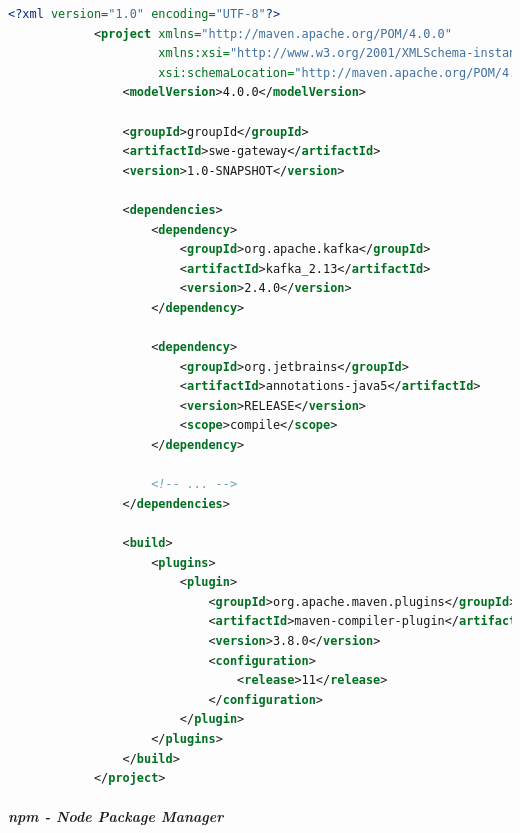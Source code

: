 		\begin{lstlisting}[language=xml,captionpos=b,caption={Esempio di implementazione di un file pom.xml}]
			<?xml version="1.0" encoding="UTF-8"?>
			<project xmlns="http://maven.apache.org/POM/4.0.0"
			         xmlns:xsi="http://www.w3.org/2001/XMLSchema-instance"
			         xsi:schemaLocation="http://maven.apache.org/POM/4.0.0 http://maven.apache.org/xsd/maven-4.0.0.xsd">
			    <modelVersion>4.0.0</modelVersion>
			
			    <groupId>groupId</groupId>
			    <artifactId>swe-gateway</artifactId>
			    <version>1.0-SNAPSHOT</version>
			    
			    <dependencies>
			        <dependency>
			            <groupId>org.apache.kafka</groupId>
			            <artifactId>kafka_2.13</artifactId>
			            <version>2.4.0</version>
			        </dependency>
			        
			        <dependency>
			            <groupId>org.jetbrains</groupId>
			            <artifactId>annotations-java5</artifactId>
			            <version>RELEASE</version>
			            <scope>compile</scope>
			        </dependency>
			
			        <!-- ... -->
			    </dependencies>
			    
			    <build>
			        <plugins>
			            <plugin>
			                <groupId>org.apache.maven.plugins</groupId>
			                <artifactId>maven-compiler-plugin</artifactId>
			                <version>3.8.0</version>
			                <configuration>
			                    <release>11</release>
			                </configuration>
			            </plugin>
			        </plugins>
			    </build>
			</project>
		\end{lstlisting}

		\subparagraph{npm - Node Package Manager}

